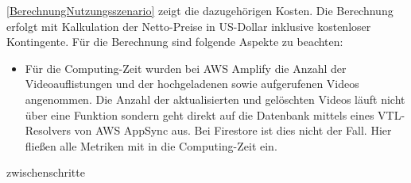 \autoref{BerechnungNutzungsszenario} zeigt die dazugehörigen Kosten. Die Berechnung erfolgt mit Kalkulation der Netto-Preise in US-Dollar inklusive kostenloser Kontingente. Für die Berechnung sind folgende Aspekte zu beachten:

\begin{itemize}
  \item Für die Computing-Zeit wurden bei \ac{AWS} Amplify die Anzahl der Videoauflistungen und der hochgeladenen sowie aufgerufenen Videos angenommen. Die Anzahl der aktualisierten und gelöschten Videos läuft nicht über eine Funktion sondern geht direkt auf die Datenbank mittels eines VTL-Resolvers von \ac{AWS} AppSync aus. Bei Firestore ist dies nicht der Fall. Hier fließen alle Metriken mit in die Computing-Zeit ein.
\end{itemize}

zwischenschritte

